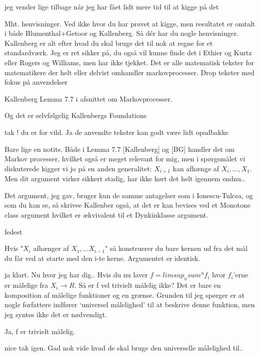 \documentclass{article}
\begin{document}
jeg vender lige tilbage når jeg har fået lidt mere tid til at kigge på det

Mht. henvisninger. Ved ikke hvor du har prøvet at kigge, men resultatet er omtalt i både Blumenthal+Getoor og Kallenberg. Så dér har du nogle henvisninger. Kallenberg er alt efter hvad du skal bruge det til nok at regne for et standardværk. Jeg er ret sikker på, du også vil kunne finde det i Ethier og Kurtz eller Rogers og Williams, men har ikke tjekket. Det er alle matematisk tekster for matematikere der helt eller delvist omhandler markovprocesser. Drop tekster med fokus på anvendelser 

Kallenberg Lemma 7.7 i afsnittet om Markovprocesser.

Og det er selvfølgelig Kallenbergs Foundations 

tak ! du er for vild. Ja de anvendte tekster kan godt være lidt opadbakke 

Bare lige en notits. Både i Lemma 7.7 [Kallenberg] og [BG] handler det om Markov processer, hvilket også er meget relevant for mig, men i spørgsmålet vi diskuterede kigger vi jo på en anden generalitet: $X_{i+1}$ kan afhænge af $X_i, \dots, X_1$. Men dit argument virker sikkert stadig, har ikke kørt det helt igennem endnu..
	
Det argument, jeg gav, bruger kun de samme antagelser som i Ionescu-Tulcea, og som du kan se, så skrivee Kallenber også, at det er kan bevises ved et Monotone class argument hvilket er ækvivalent til et Dynkinklasse argument.

fedest

Hvis "$X_i$ afhænger af $X_1, ... X_{i-1}$" så konstruerer du bare kernen ud fra det mål du får ved at starte med den i-te kerne. Argumentet er identisk.

ja klart. Nu hvor jeg har dig.. Hvis du nu laver $f= limsup_n sum^n f_i$ hvor $f_i$’erne er målelige fra $X_i \to R$. Så er f vel trivielt målelig ikke? Det er bare en komposition af målelige funktioner og en grænse. Grunden til jeg spørger er at nogle forfattere indfører ‘universel målelighed’ til at beskrive denne funktion, men jeg syntes ikke det er nødvendigt.

Ja, f er trivielt målelig.

nice tak igen. Gad nok vide hvad de skal bruge den universelle målelighed til..
\end{document}
